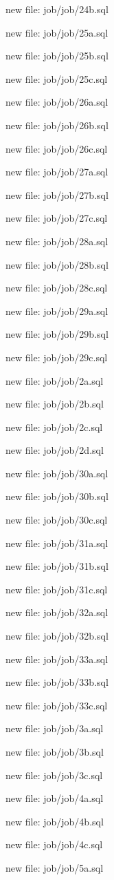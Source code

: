 \documentclass[11pt,a4paper]{article}
\begin{document}
{new file:   job/job/24b.sql

new file:   job/job/25a.sql

new file:   job/job/25b.sql

new file:   job/job/25c.sql

new file:   job/job/26a.sql

new file:   job/job/26b.sql

new file:   job/job/26c.sql

new file:   job/job/27a.sql

new file:   job/job/27b.sql

new file:   job/job/27c.sql

new file:   job/job/28a.sql

new file:   job/job/28b.sql

new file:   job/job/28c.sql

new file:   job/job/29a.sql

new file:   job/job/29b.sql

new file:   job/job/29c.sql

new file:   job/job/2a.sql

new file:   job/job/2b.sql

new file:   job/job/2c.sql

new file:   job/job/2d.sql

new file:   job/job/30a.sql

new file:   job/job/30b.sql

new file:   job/job/30c.sql

new file:   job/job/31a.sql

new file:   job/job/31b.sql

new file:   job/job/31c.sql

new file:   job/job/32a.sql

new file:   job/job/32b.sql

new file:   job/job/33a.sql

new file:   job/job/33b.sql

new file:   job/job/33c.sql

new file:   job/job/3a.sql

new file:   job/job/3b.sql

new file:   job/job/3c.sql

new file:   job/job/4a.sql

new file:   job/job/4b.sql

new file:   job/job/4c.sql

new file:   job/job/5a.sql

}
\end{document}
